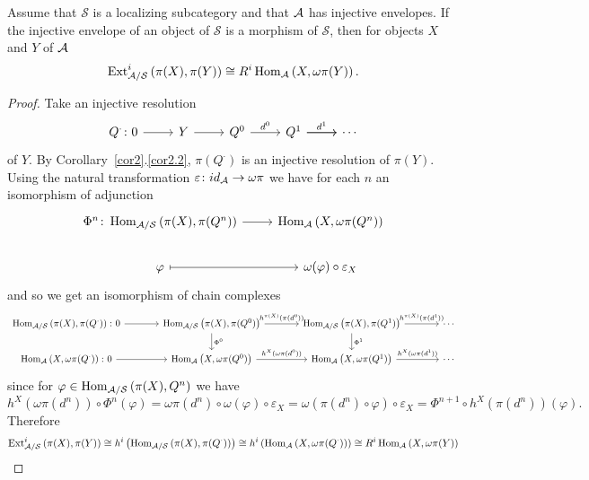 \documentclass[dissertation.tex]{subfiles}
\begin{document}
\begin{cor}\label{cor3}
  Assume that $\mathcal{S}$ is a localizing subcategory and that $\mathcal{A}$ has injective envelopes.
  If the injective envelope of an object of $\mathcal{S}$ is a morphism of $\mathcal{S}$, then for objects $X$ and $Y$ of $\mathcal{A}$
  $$\operatorname{Ext}^{i}_{\mathcal{A}/\mathcal{S}}\left(\pi(X), \pi(Y)\right) \cong R^i \operatorname{Hom}_{\mathcal{A}}\left(X, \omega\pi(Y)\right).$$
  
  \begin{proof}
    Take an injective resolution
    $$\begin{tikzcd}
      Q^\cdot \colon 0 \arrow{r} & Y \arrow{r} & Q^0 \arrow{r}{d^0} & Q^1 \arrow{r}{d^1} \arrow{r} & \cdots 
    \end{tikzcd}$$
    of $Y$.
    By Corollary~\ref{cor2}.\ref{cor2.2}, $\pi(Q^\cdot)$ is an injective resolution of $\pi(Y)$.
    Using the natural transformation $\varepsilon \colon id_{\mathcal{A}} \rightarrow \omega\pi$ we have for each $n$ an isomorphism of adjunction
    $$\begin{tikzcd}
      \Phi^n \colon \Hom{\A/\mathcal{S}}{\pi(X), \pi(Q^n)} \arrow{r} & \Hom{\A}{X, \omega\pi(Q^n)}\\
      \varphi \arrow[mapsto]{r} & \omega(\varphi) \circ \varepsilon_X
    \end{tikzcd}$$
    and so we get an isomorphism of chain complexes
    $$\begin{tikzcd}[column sep=large]
      \Hom{\A/\mathcal{S}}{\pi(X), \pi(Q^\cdot)} \colon 0 \arrow{r} & \Hom{\A/\mathcal{S}}{\pi(X),\pi(Q^0)} \arrow{d}{\Phi^0}\arrow{r}{h^{\pi(X)}(\pi(d^0))} & \Hom{\A/\mathcal{S}}{\pi(X), \pi(Q^1)}\arrow{d}{\Phi^1} \arrow{r}{h^{\pi(X)}(\pi(d^1))} & \cdots\\
      \Hom{\A}{X, \omega\pi(Q^\cdot)} \colon 0 \arrow{r} & \Hom{\A}{X,\omega\pi(Q^0)} \arrow{r}{h^X(\omega\pi(d^0))} & \Hom{\A}{X, \omega\pi(Q^1)} \arrow{r}{h^X(\omega\pi(d^1))} & \cdots
    \end{tikzcd}$$
    since for $\varphi \in \operatorname{Hom}_{\mathcal{A}/\mathcal{S}}\left(\pi(X), Q^n\right)$ we have
    $$h^X(\omega\pi(d^n)) \circ \Phi^n(\varphi) = \omega\pi(d^n) \circ \omega(\varphi) \circ \varepsilon_X = \omega(\pi(d^n) \circ \varphi) \circ \varepsilon_X = \Phi^{n+1} \circ h^X(\pi(d^n))(\varphi).$$
    Therefore 
    $$\operatorname{Ext}^{i}_{\mathcal{A}/\mathcal{S}}\left(\pi(X), \pi(Y)\right) \cong h^i\left(\operatorname{Hom}_{\mathcal{A}/\mathcal{S}}\left(\pi(X), \pi(Q^\cdot)\right)\right) \cong h^i\left(\operatorname{Hom}_{\mathcal{A}}\left(X, \omega\pi(Q^\cdot)\right)\right) \cong R^i \operatorname{Hom}_{\mathcal{A}}\left(X, \omega\pi(Y)\right)$$
  \end{proof}
\end{cor}
\end{document}
